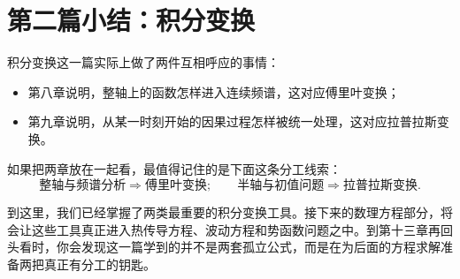 \section*{第二篇小结：积分变换}

\begin{tishi}[从积分变换到数理方程]
积分变换这一篇实际上做了两件互相呼应的事情：
\begin{itemize}
    \item 第八章说明，整轴上的函数怎样进入连续频谱，这对应傅里叶变换；
    \item 第九章说明，从某一时刻开始的因果过程怎样被统一处理，这对应拉普拉斯变换。
\end{itemize}

如果把两章放在一起看，最值得记住的是下面这条分工线索：
\[
    \text{整轴与频谱分析}
    \Longrightarrow
    \text{傅里叶变换};
    \qquad
    \text{半轴与初值问题}
    \Longrightarrow
    \text{拉普拉斯变换}.
\]

到这里，我们已经掌握了两类最重要的积分变换工具。接下来的数理方程部分，将会让这些工具真正进入热传导方程、波动方程和势函数问题之中。到第十三章再回头看时，你会发现这一篇学到的并不是两套孤立公式，而是在为后面的方程求解准备两把真正有分工的钥匙。
\end{tishi}
